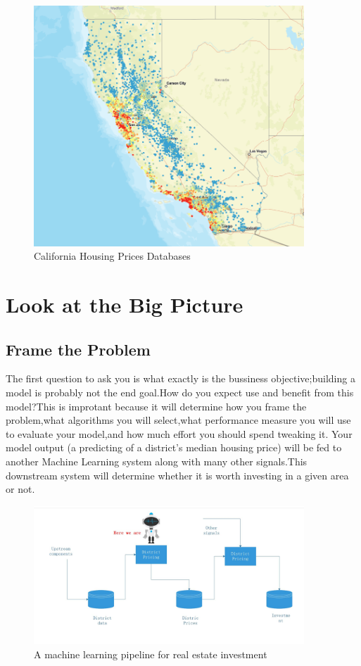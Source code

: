 \documentclass[UTF8]{ctexart}
\begin{document}
\begin{figure}[H]
\centering
\includegraphics[width = 4in]{picture.png}
\caption{California Housing Prices Databases}
\end{figure}

\section{Look at the Big Picture}
\subsection{Frame the Problem}
The first question to ask you is what exactly is the bussiness objective;building a model is probably not the end goal.How do you expect use and benefit from this model?This is improtant because it will determine how you frame the problem,what algorithms you will select,what performance measure you will use to evaluate your model,and how much effort you should spend tweaking it.
Your model output (a predicting of a district's median housing price) will be fed to another Machine Learning system along with many other signals.This downstream system will determine whether it is worth investing in a given area or not.

\begin{figure}[H]
\centering
\includegraphics[width = 4in]{PROCESS.JPG}
\caption{A machine learning pipeline for real estate investment}
\end{figure}
\end{document}
